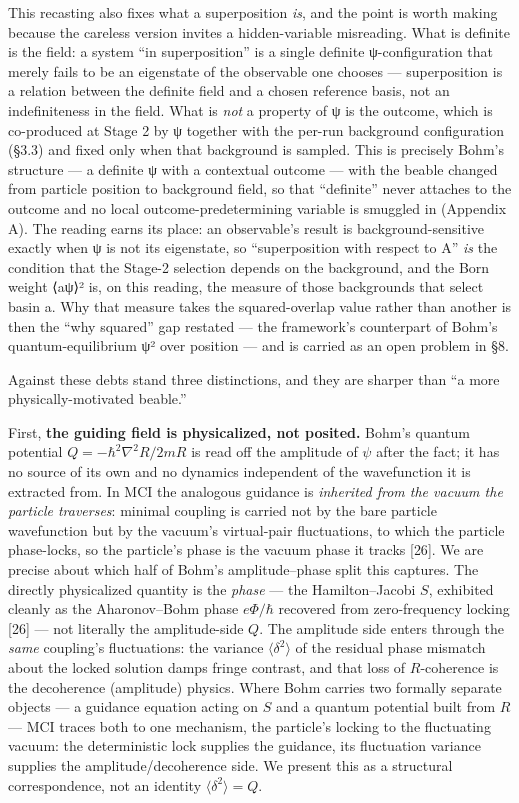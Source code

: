 \documentclass[
]{article}
\begin{document}
This recasting also fixes what a superposition \emph{is}, and the point
is worth making because the careless version invites a hidden-variable
misreading. What is definite is the field: a system ``in superposition''
is a single definite ψ-configuration that merely fails to be an
eigenstate of the observable one chooses --- superposition is a relation
between the definite field and a chosen reference basis, not an
indefiniteness in the field. What is \emph{not} a property of ψ is the
outcome, which is co-produced at Stage 2 by ψ together with the per-run
background configuration (§3.3) and fixed only when that background is
sampled. This is precisely Bohm's structure --- a definite ψ with a
contextual outcome --- with the beable changed from particle position to
background field, so that ``definite'' never attaches to the outcome and
no local outcome-predetermining variable is smuggled in (Appendix A).
The reading earns its place: an observable's result is
background-sensitive exactly when ψ is not its eigenstate, so
``superposition with respect to A'' \emph{is} the condition that the
Stage-2 selection depends on the background, and the Born weight
\textbar⟨a\textbar ψ⟩\textbar² is, on this reading, the measure of those
backgrounds that select basin a. Why that measure takes the
squared-overlap value rather than another is then the ``why squared''
gap restated --- the framework's counterpart of Bohm's
quantum-equilibrium \textbar ψ\textbar² over position --- and is carried
as an open problem in §8.

Against these debts stand three distinctions, and they are sharper than
``a more physically-motivated beable.''

First, \textbf{the guiding field is physicalized, not posited.} Bohm's
quantum potential \(Q = -\hbar^2\nabla^2 R / 2mR\) is read off the
amplitude of \(\psi\) after the fact; it has no source of its own and no
dynamics independent of the wavefunction it is extracted from. In MCI
the analogous guidance is \emph{inherited from the vacuum the particle
traverses}: minimal coupling is carried not by the bare particle
wavefunction but by the vacuum's virtual-pair fluctuations, to which the
particle phase-locks, so the particle's phase is the vacuum phase it
tracks {[}26{]}. We are precise about which half of Bohm's
amplitude--phase split this captures. The directly physicalized quantity
is the \emph{phase} --- the Hamilton--Jacobi \(S\), exhibited cleanly as
the Aharonov--Bohm phase \(e\Phi/\hbar\) recovered from zero-frequency
locking {[}26{]} --- not literally the amplitude-side \(Q\). The
amplitude side enters through the \emph{same} coupling's fluctuations:
the variance \(\langle\delta^2\rangle\) of the residual phase mismatch
about the locked solution damps fringe contrast, and that loss of
\(R\)-coherence is the decoherence (amplitude) physics. Where Bohm
carries two formally separate objects --- a guidance equation acting on
\(S\) and a quantum potential built from \(R\) --- MCI traces both to
one mechanism, the particle's locking to the fluctuating vacuum: the
deterministic lock supplies the guidance, its fluctuation variance
supplies the amplitude/decoherence side. We present this as a structural
correspondence, not an identity \(\langle\delta^2\rangle = Q\).
\end{document}
